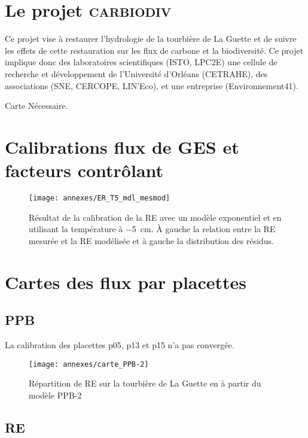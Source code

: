 \section{Le projet \textsc{carbiodiv}}
\label{sec:carbiodiv}

Ce projet vise à restaurer l'hydrologie de la tourbière de La Guette et de suivre les effets de cette restauration sur les flux de carbone et la biodiversité.
Ce projet implique donc des laboratoires scientifiques (ISTO, LPC2E) une cellule de recherche et développement de l'Université d'Orléans (CETRAHE), des associations (SNE, CERCOPE, LIN'Eco), et une entreprise (Environnement41).

Carte Nécessaire.



\section{Calibrations flux de GES et facteurs contrôlant}
\label{sec:calib_flux}

\begin{figure}[!hbt]
\centering
\texttt{[image: annexes/ER\_T5\_mdl\_mesmod]}\\
\caption{Résultat de la calibration de la RE avec un modèle exponentiel et en utilisant la température à \SI{-5}{\centi\metre}. À gauche la relation entre la RE mesurée et la RE modélisée et à gauche la distribution des résidus.}
\label{fig:RE_T5}
\end{figure}




\clearpage
\section{Cartes des flux par placettes}
\label{sec:carte_flux}

\subsection{PPB}
\label{subsec:carte_ppb}
La calibration des placettes p05, p13 et p15 n'a pas convergée.

\begin{figure}[!hbt]
\centering
\texttt{[image: annexes/carte\_PPB-2]}
\caption{Répartition de RE sur la tourbière de La Guette en \si{\gcma} à partir du modèle PPB-2}
\label{fig:rep_PPB-2}
\end{figure}

\clearpage
\subsection{RE}
\label{subsec:carte_re}

